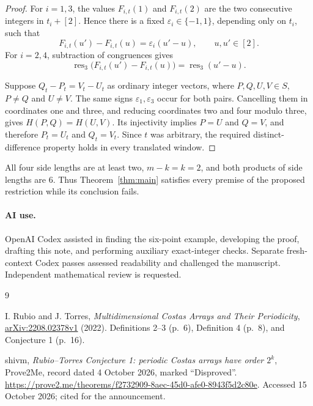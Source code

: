 \documentclass[11pt,a4paper]{article}
\newcommand{\res}{\operatorname{res}}
\begin{document}
\begin{proof}
For $i=1,3$, the values $F_{i,t}(1)$ and $F_{i,t}(2)$ are the two
consecutive integers in $t_i+[2]$. Hence there is a fixed
$\varepsilon_i\in\{-1,1\}$, depending only on $t_i$, such that
\[
 F_{i,t}(u')-F_{i,t}(u)=\varepsilon_i(u'-u),
 \qquad u,u'\in[2].
\]
For $i=2,4$, subtraction of congruences gives
\[
 \res_3\bigl(F_{i,t}(u')-F_{i,t}(u)\bigr)=\res_3(u'-u).
\]

Suppose $Q_t-P_t=V_t-U_t$ as ordinary integer vectors, where
$P,Q,U,V\in S$, $P\ne Q$ and $U\ne V$. The same signs
$\varepsilon_1,\varepsilon_3$ occur for both pairs. Cancelling them in
coordinates one and three, and reducing coordinates two and four modulo
three, gives $H(P,Q)=H(U,V)$. Its injectivity implies $P=U$ and $Q=V$,
and therefore $P_t=U_t$ and $Q_t=V_t$. Since $t$ was arbitrary, the required
distinct-difference property holds in every translated window.
\end{proof}

All four side lengths are at least two, $m-k=k=2$, and both products of
side lengths are $6$. Thus Theorem~\ref{thm:main} satisfies every premise
of the proposed restriction while its conclusion fails.

\paragraph{AI use.}
OpenAI Codex assisted in finding the six-point example, developing the proof,
drafting this note, and performing auxiliary exact-integer checks.
Separate fresh-context Codex passes assessed readability and challenged the
manuscript. Independent mathematical review is requested.

\begin{thebibliography}{9}
\raggedright
{}
I. Rubio and J. Torres,
\emph{Multidimensional Costas Arrays and Their Periodicity},
\href{https://arxiv.org/abs/2208.02378v1}{arXiv:2208.02378v1} (2022).
Definitions 2--3 (p.~6), Definition 4 (p.~8), and Conjecture 1 (p.~16).

shivm,
\emph{Rubio--Torres Conjecture 1: periodic Costas arrays have order $2^k$},
Prove2Me, record dated 4 October 2026, marked ``Disproved''.
\url{https://prove2.me/theorems/f2732909-8aec-45d0-afe0-8943f5d2c80e}.
Accessed 15 October 2026; cited for the announcement.
\end{thebibliography}
\end{document}

